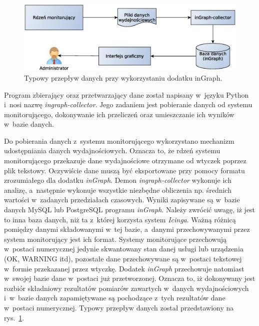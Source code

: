 \begin{figure}[ht]
  \caption{Typowy przepływ danych przy wykorzystaniu dodatku inGraph.}
  \label{fig:inGraphFlow}
\includegraphics[width=1\textwidth]{img/ingraphFlow}
\end{figure}

Program zbierający oraz przetwarzający dane został napisany w~języku
Python i~nosi nazwę {\em ingraph-collector}. Jego zadaniem jest pobieranie
danych od systemu monitorującego, dokonywanie ich przeliczeń oraz
umieszczanie ich wyników w~bazie danych.

Do pobierania danych z~systemu monitorującego wykorzystano mechanizm
udostępniania danych wydajnościowych. Oznacza to, że rdzeń systemu
monitorującego przekazuje dane wydajnościowe otrzymane od wtyczek
poprzez plik tekstowy. Oczywiście dane muszą być eksportowane przy
pomocy formatu zrozumiałego dla dodatku {\em inGraph}. Demon
{\em ingraph-collector} wykonuje ich analizę, a~następnie wykonuje wszystkie
niezbędne obliczenia np. średnich wartości w~zadanych przedziałach
czasowych. Wyniki zapisywane są w~bazie danych MySQL lub PostgreSQL
programu {\em inGraph}. Należy zwrócić uwagę, iż jest to inna baza danych,
niż ta z~której korzysta system {\em Icinga}. Ważną różnicą pomiędzy danymi
składowanymi w~tej bazie, a~danymi przechowywanymi przez system
monitorujący jest ich format. Systemy monitorujące przechowują
w~postaci numerycznej jedynie skwantowany stan danej usługi lub
urządzenia (OK, WARNING itd), pozostałe dane przechowywane są
w~postaci tekstowej w~formie przekazanej przez wtyczkę. Dodatek
{\em inGraph} przechowuje natomiast w~swojej bazie dane w~postaci już
przetworzonej. Oznacza to, iż dokonywany jest rozbiór składniowy
rezultatów pomiarów zawartych w~danych wydajnościowych i~w~bazie
danych zapamiętywane są pochodzące z~tych rezultatów dane w~postaci
numerycznej. Typowy przepływ danych został przedstawiony
na rys.~\ref{fig:inGraphFlow}.

